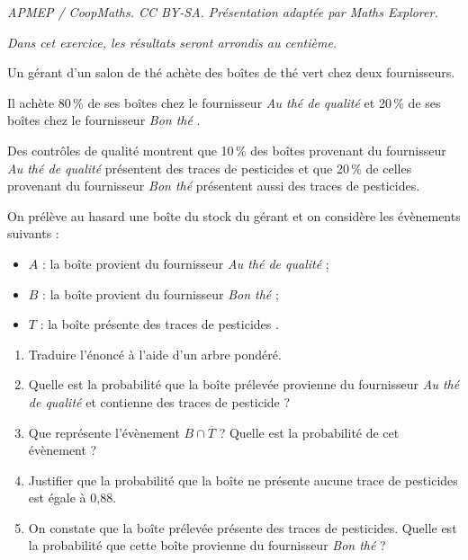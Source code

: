 \documentclass[10pt]{article}
\begin{document}
\noindent\textit{APMEP / CoopMaths. CC BY-SA. Présentation adaptée par Maths Explorer.}\par\medskip
\medskip

\emph{Dans cet exercice, les résultats seront arrondis au centième.}

\bigskip

Un gérant d'un salon de thé achète des boîtes de thé vert chez deux fournisseurs.

Il achète 80\,\% de ses boîtes chez le fournisseur \og{} \emph{Au thé de qualité} \fg{} et 20\,\% de ses boîtes chez le fournisseur \og{}\emph{Bon thé} \fg.

Des contrôles de qualité montrent que 10\,\% des boîtes provenant du fournisseur \og{} \emph{Au thé de qualité} \fg{} présentent des traces de pesticides et que 20\,\% de celles provenant du fournisseur \og{} \emph{Bon thé} \fg{} présentent aussi des traces de pesticides.

On prélève au hasard une boîte du stock du gérant et on considère les évènements suivants :
\begin{itemize}
\item $A$ : \og la boîte provient du fournisseur \og\emph{Au thé de qualité} \fg{}  ;
\item $B$ : \og la boîte provient du fournisseur \og \emph{Bon thé} \fg{}  ;
\item $T$ : \og la boîte présente des traces de pesticides \fg.
\end{itemize}

\medskip

\begin{enumerate}
\item Traduire l'énoncé à l'aide d'un arbre pondéré.
\item Quelle est la probabilité que la boîte prélevée provienne du fournisseur \og{} \emph{Au thé de qualité} \fg{} et contienne des traces de pesticide ?
\item Que représente l'évènement $B\cap\overline{T}$ ? Quelle est la probabilité de cet évènement ?
\item Justifier que la probabilité que la boîte ne présente aucune trace de pesticides est égale à 0,88.
\item On constate que la boîte prélevée présente des traces de pesticides. Quelle est la probabilité que cette boîte provienne du fournisseur \og \emph{Bon thé} \fg{} ?
\end{enumerate}

\vspace{0,5cm}
\end{document}
